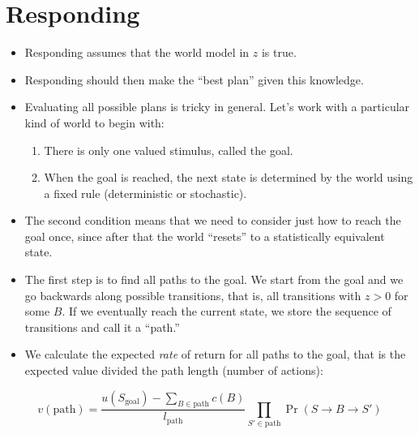 \documentclass[11pt]{article}
\begin{document}
\section{Responding}
\label{sec:org6dbfce8}

\begin{itemize}
\item Responding assumes that the world model in \(z\) is true.

\item Responding should then make the ``best plan'' given this
knowledge.

\item Evaluating all possible plans is tricky in general. Let's work with
a particular kind of world to begin with:
\begin{enumerate}
\item There is only one valued stimulus, called the goal.
\item When the goal is reached, the next state is determined by the
world using a fixed rule (deterministic or stochastic).
\end{enumerate}

\item The second condition means that we need to consider just how to
reach the goal once, since after that the world ``resets'' to a
statistically equivalent state.

\item The first step is to find all paths to the goal. We start from the
goal and we go backwards along possible transitions, that is, all
transitions with \(z>0\) for some \(B\). If we eventually reach the
current state, we store the sequence of transitions and call it a
``path.''

\item We calculate the expected \emph{rate} of return for all paths to the
goal, that is the expected value divided the path length (number of
actions):
\end{itemize}
\begin{equation}
  \label{eq:path-value}
  v(\mathrm{path}) = \frac{ u(S_\mathrm{goal}) -\sum_{B\in\mathrm{path}} c(B)}{ l_\mathrm{path} } \prod_{S'\in\mathrm{path}} \Pr(S\to B\to S') 
\end{equation}
\end{document}
